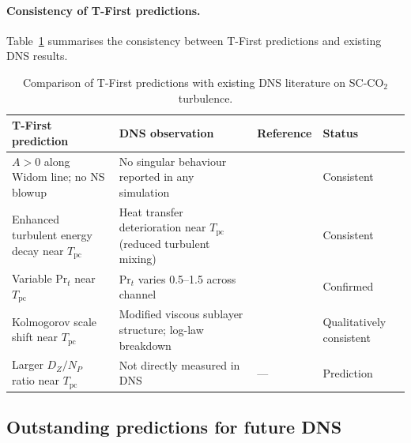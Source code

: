 \documentclass[12pt,a4paper]{article}
\newcommand{\Tc}{T_{\mathrm{pc}}}   %
\begin{document}
\paragraph{Consistency of T-First predictions.}
Table~\ref{tab:comparison} summarises the consistency between T-First predictions
and existing DNS results.

\begin{table}[htbp]
  \centering
  \caption{Comparison of T-First predictions with existing DNS literature on
    SC-CO$_2$ turbulence.}
  \label{tab:comparison}
  \smallskip
  \begin{tabular}{p{4cm}p{4cm}p{4cm}l}
  \toprule
  {T-First prediction} & {DNS observation} & {Reference} & {Status} \\
  \midrule
  $A > 0$ along Widom line; no NS blowup &
  No singular behaviour reported in any simulation &
  \cite{KimBae2016,Nicoud2011} & Consistent \\[4pt]

  Enhanced turbulent energy decay near $\Tc$ &
  Heat transfer deterioration near $\Tc$ (reduced turbulent mixing) &
  \cite{KimBae2016} & Consistent \\[4pt]

  Variable $\mathrm{Pr}_t$ near $\Tc$ &
  $\mathrm{Pr}_t$ varies 0.5--1.5 across channel &
  \cite{KimBae2016} & Confirmed \\[4pt]

  Kolmogorov scale shift near $\Tc$ &
  Modified viscous sublayer structure; log-law breakdown &
  \cite{KimBae2016} & Qualitatively consistent \\[4pt]

  Larger $D_Z/N_P$ ratio near $\Tc$ &
  Not directly measured in DNS &
  --- & Prediction \\
  \bottomrule
  \end{tabular}
\end{table}

\subsection{Outstanding predictions for future DNS}
\label{sec:comparison:future}
\end{document}
